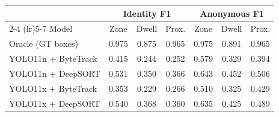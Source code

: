 \begin{tabular}{lcccccc}
\toprule
 & \multicolumn{3}{c}{Identity F1} & \multicolumn{3}{c}{Anonymous F1} \\
\cmidrule(lr){2-4} \cmidrule(lr){5-7}
Model & Zone & Dwell & Prox. & Zone & Dwell & Prox. \\
\midrule
Oracle (GT boxes) & 0.975 & 0.875 & 0.965 & 0.975 & 0.891 & 0.965 \\
YOLO11n + ByteTrack & 0.415 & 0.244 & 0.252 & 0.579 & 0.329 & 0.394 \\
YOLO11n + DeepSORT & 0.531 & 0.350 & 0.366 & 0.643 & 0.452 & 0.506 \\
YOLO11x + ByteTrack & 0.353 & 0.229 & 0.266 & 0.510 & 0.325 & 0.429 \\
YOLO11x + DeepSORT & 0.540 & 0.368 & 0.360 & 0.635 & 0.425 & 0.489 \\
\bottomrule
\end{tabular}
